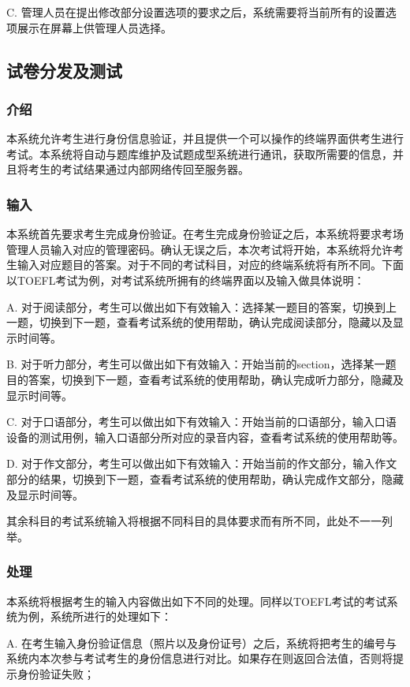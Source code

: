 C. 管理人员在提出修改部分设置选项的要求之后，系统需要将当前所有的设置选项展示在屏幕上供管理人员选择。

\subsection{试卷分发及测试}

\subsubsection{介绍}
本系统允许考生进行身份信息验证，并且提供一个可以操作的终端界面供考生进行考试。本系统将自动与题库维护及试题成型系统进行通讯，获取所需要的信息，并且将考生的考试结果通过内部网络传回至服务器。
	
\subsubsection{输入}
本系统首先要求考生完成身份验证。在考生完成身份验证之后，本系统将要求考场管理人员输入对应的管理密码。确认无误之后，本次考试将开始，本系统将允许考生输入对应题目的答案。对于不同的考试科目，对应的终端系统将有所不同。下面以TOEFL考试为例，对考试系统所拥有的终端界面以及输入做具体说明：

A. 对于阅读部分，考生可以做出如下有效输入：选择某一题目的答案，切换到上一题，切换到下一题，查看考试系统的使用帮助，确认完成阅读部分，隐藏以及显示时间等。

B. 对于听力部分，考生可以做出如下有效输入：开始当前的section，选择某一题目的答案，切换到下一题，查看考试系统的使用帮助，确认完成听力部分，隐藏及显示时间等。

C. 对于口语部分，考生可以做出如下有效输入：开始当前的口语部分，输入口语设备的测试用例，输入口语部分所对应的录音内容，查看考试系统的使用帮助等。

D. 对于作文部分，考生可以做出如下有效输入：开始当前的作文部分，输入作文部分的结果，切换到下一题，查看考试系统的使用帮助，确认完成作文部分，隐藏及显示时间等。

其余科目的考试系统输入将根据不同科目的具体要求而有所不同，此处不一一列举。

\subsubsection{处理}
本系统将根据考生的输入内容做出如下不同的处理。同样以TOEFL考试的考试系统为例，系统所进行的处理如下：

A. 在考生输入身份验证信息（照片以及身份证号）之后，系统将把考生的编号与系统内本次参与考试考生的身份信息进行对比。如果存在则返回合法值，否则将提示身份验证失败；

